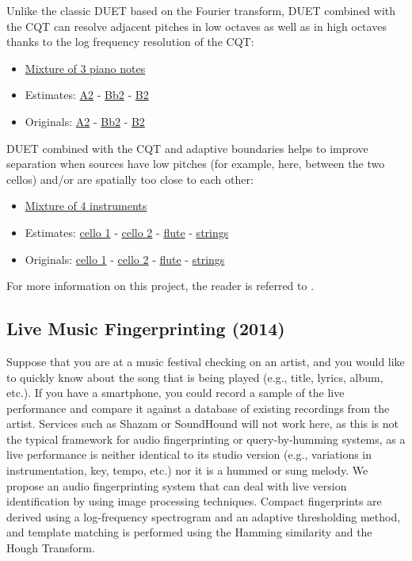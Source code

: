 \documentclass{article}
\begin{document}
Unlike the classic DUET based on the Fourier transform, DUET combined with the CQT can resolve adjacent pitches in low octaves as well as in high octaves thanks to the log frequency resolution of the CQT:
\begin{itemize}[noitemsep,topsep=0pt]
\item \href{Audio/DUET/piano_mixture.mp3}{Mixture of 3 piano notes}
\item Estimates: \href{Audio/DUET/A2_estimated.mp3}{A2} - \href{Audio/DUET/Bb2_estimated.mp3}{Bb2} -  \href{Audio/DUET/B2_estimated.mp3}{B2}
\item Originals: \href{Audio/DUET/A2_original.mp3}{A2} - \href{Audio/DUET/Bb2_original.mp3}{Bb2} - \href{Audio/DUET/B2_original.mp3}{B2}
\end{itemize}

DUET combined with the CQT and adaptive boundaries helps to improve separation when sources have low pitches (for example, here, between the two cellos) and/or are spatially too close to each other:
\begin{itemize}[noitemsep,topsep=0pt]
\item \href{Audio/DUET/instruments_mixture.mp3}{Mixture of 4 instruments}
\item Estimates: \href{Audio/DUET/cello1_estimated.mp3}{cello 1} - \href{Audio/DUET/cello2_estimated.mp3}{cello 2} - \href{Audio/DUET/flute_estimated.mp3}{flute} - \href{Audio/DUET/strings_estimated.mp3}{strings}
\item Originals: \href{Audio/DUET/cello1_original.mp3}{cello 1} - \href{Audio/DUET/cello2_original.mp3}{cello 2} - \href{Audio/DUET/flute_original.mp3}{flute} - \href{Audio/DUET/strings_original.mp3}{strings}
\end{itemize}

For more information on this project, the reader is referred to \cite{inproceedings_rafii_may2011_2}.


\subsection{Live Music Fingerprinting (2014)}
\label{ssec:live} 

Suppose that you are at a music festival checking on an artist, and you would like to quickly know about the song that is being played (e.g., title, lyrics, album, etc.). If you have a smartphone, you could record a sample of the live performance and compare it against a database of existing recordings from the artist. Services such as Shazam or SoundHound will not work here, as this is not the typical framework for audio fingerprinting or query-by-humming systems, as a live performance is neither identical to its studio version (e.g., variations in instrumentation, key, tempo, etc.) nor it is a hummed or sung melody. We propose an audio fingerprinting system that can deal with live version identification by using image processing techniques. Compact fingerprints are derived using a log-frequency spectrogram and an adaptive thresholding method, and template matching is performed using the Hamming similarity and the Hough Transform.
\end{document}
